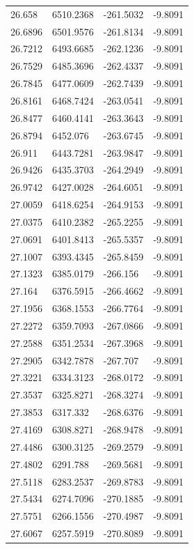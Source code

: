 \begin{table}[H]
\begin{tabular}{llll}
26.658 & 6510.2368 & -261.5032 & -9.8091 \\
26.6896 & 6501.9576 & -261.8134 & -9.8091 \\
26.7212 & 6493.6685 & -262.1236 & -9.8091 \\
26.7529 & 6485.3696 & -262.4337 & -9.8091 \\
26.7845 & 6477.0609 & -262.7439 & -9.8091 \\
26.8161 & 6468.7424 & -263.0541 & -9.8091 \\
26.8477 & 6460.4141 & -263.3643 & -9.8091 \\
26.8794 & 6452.076 & -263.6745 & -9.8091 \\
26.911 & 6443.7281 & -263.9847 & -9.8091 \\
26.9426 & 6435.3703 & -264.2949 & -9.8091 \\
26.9742 & 6427.0028 & -264.6051 & -9.8091 \\
27.0059 & 6418.6254 & -264.9153 & -9.8091 \\
27.0375 & 6410.2382 & -265.2255 & -9.8091 \\
27.0691 & 6401.8413 & -265.5357 & -9.8091 \\
27.1007 & 6393.4345 & -265.8459 & -9.8091 \\
27.1323 & 6385.0179 & -266.156 & -9.8091 \\
27.164 & 6376.5915 & -266.4662 & -9.8091 \\
27.1956 & 6368.1553 & -266.7764 & -9.8091 \\
27.2272 & 6359.7093 & -267.0866 & -9.8091 \\
27.2588 & 6351.2534 & -267.3968 & -9.8091 \\
27.2905 & 6342.7878 & -267.707 & -9.8091 \\
27.3221 & 6334.3123 & -268.0172 & -9.8091 \\
27.3537 & 6325.8271 & -268.3274 & -9.8091 \\
27.3853 & 6317.332 & -268.6376 & -9.8091 \\
27.4169 & 6308.8271 & -268.9478 & -9.8091 \\
27.4486 & 6300.3125 & -269.2579 & -9.8091 \\
27.4802 & 6291.788 & -269.5681 & -9.8091 \\
27.5118 & 6283.2537 & -269.8783 & -9.8091 \\
27.5434 & 6274.7096 & -270.1885 & -9.8091 \\
27.5751 & 6266.1556 & -270.4987 & -9.8091 \\
27.6067 & 6257.5919 & -270.8089 & -9.8091 \\

\end{tabular}
\end{table}

